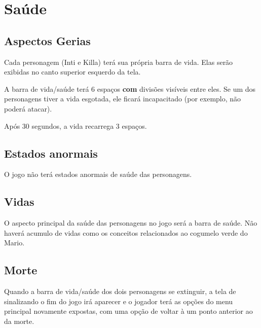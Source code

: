 \documentclass[12pt]{article}
\begin{document}
\section{Saúde}

\subsection{Aspectos Gerias}
Cada personagem (Inti e Killa) terá sua própria barra de vida. Elas serão
exibidas no canto superior esquerdo da tela.


A barra de vida/saúde terá 6 espaços {\bf com} divisões visíveis entre eles.
Se um dos personagens tiver a vida esgotada, ele ficará incapacitado (por exemplo,
não poderá atacar).


Após 30 segundos, a vida recarrega 3 espaços.

\subsection{Estados anormais}
O jogo não terá estados anormais de saúde das personagens.

\subsection{Vidas}
O aspecto principal da saúde das personagens no jogo será a barra de saúde.
Não haverá acumulo de vidas como os conceitos relacionados ao cogumelo verde
do Mario.

\subsection{Morte}
Quando a barra de vida/saúde dos dois personagens se extinguir, a tela de
sinalizando o fim do jogo irá aparecer e o jogador terá as opções do menu
principal novamente expostas, com uma opção de voltar à um ponto anterior
ao da morte.
\end{document}

